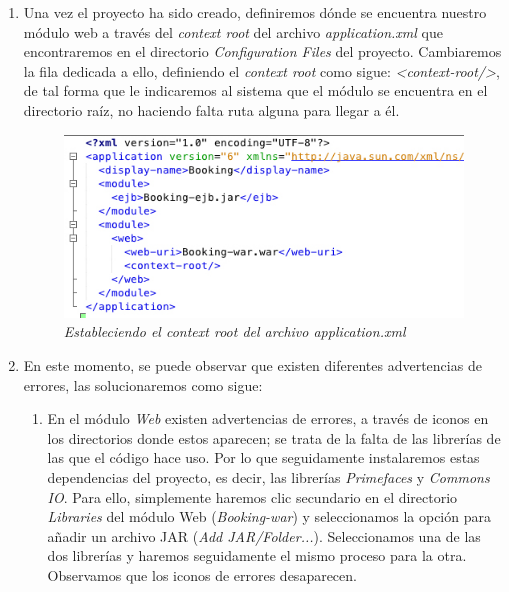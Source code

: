 \begin{enumerate}
\begin{enumerate}
\end{enumerate}

\item Una vez el proyecto ha sido creado, definiremos dónde se encuentra nuestro módulo web a través del \textit{context root} del archivo \textit{application.xml} que encontraremos en el directorio \textit{Configuration Files} del proyecto. Cambiaremos la fila dedicada a ello, definiendo el \textit{context root} como sigue: \textit{<context-root/>}, de tal forma que le indicaremos al sistema que el módulo se encuentra en el directorio raíz, no haciendo falta ruta alguna para llegar a él.

\begin{figure}
\centering
  \includegraphics[scale=.65]{img/instalacion/context-root.jpg}
  \caption{\textit{Estableciendo el context root del archivo application.xml}}
  \label{fig:context-root}
\end{figure}

\item En este momento, se puede observar que existen diferentes advertencias de errores, las solucionaremos como sigue:

\begin{enumerate}
\item En el módulo \textit{Web} existen advertencias de errores, a través de iconos en los directorios donde estos aparecen; se trata de la falta de las librerías de las que el código hace uso. Por lo que seguidamente instalaremos estas dependencias del proyecto, es decir, las librerías \textit{Primefaces} y \textit{Commons IO}. Para ello, simplemente haremos clic secundario en el directorio \textit{Libraries} del módulo Web (\textit{Booking-war}) y seleccionamos la opción para añadir un archivo JAR (\textit{Add JAR/Folder...}). Seleccionamos una de las dos librerías y haremos seguidamente el mismo proceso para la otra. Observamos que los iconos de errores desaparecen. 


\end{enumerate}
\end{enumerate}

